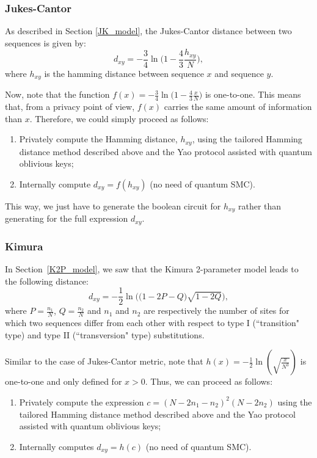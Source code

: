 \subsubsection{Jukes-Cantor} 
As described in Section \ref{JK_model}, the Jukes-Cantor distance between two sequences is given by:
$$d_{xy} = -\frac{3}{4} \ln \Big(1- \frac{4}{3}\frac{h_{xy}}{N}\Big),$$
where $h_{xy}$ is the hamming distance between sequence $x$ and sequence $y$.

Now, note that the function $f(x) = -\frac{3}{4} \ln \Big(1- \frac{4}{3}\frac{x}{N}\Big)$ is one-to-one. This means that, from a privacy point of view, $f(x)$ carries the same amount of information than $x$. Therefore, we could simply proceed as follows:

\begin{enumerate}
    \item Privately compute the Hamming distance, $h_{xy}$, using the tailored Hamming distance method described above and the Yao protocol assisted with quantum oblivious keys;
    \item Internally compute $d_{xy} = f(h_{xy})$ (no need of quantum SMC).
\end{enumerate}

This way, we just have to generate the boolean circuit for $h_{xy}$ rather than generating for the full expression $d_{xy}$.


\subsubsection{Kimura}
In Section~\ref{K2P_model}, we saw that the Kimura 2-parameter model leads to the following distance:
$$d_{xy} = -\frac{1}{2}\ln\bigg( \big(1-2P-Q\big) \sqrt{1-2Q} \bigg),$$
where $P=\frac{n_1}{N}$, $Q=\frac{n_2}{N}$ and $n_1$ and $n_2$ are respectively the number of sites for which two sequences differ from each other with respect to type I (``transition" type) and type II (``transversion" type) substitutions.

Similar to the case of Jukes-Cantor metric, note that $h(x) = -\frac{1}{2}\ln(\sqrt{\frac{x}{N^3}})$ is one-to-one and only defined for $x>0$. Thus, we can proceed as follows:

\begin{enumerate}
    \item Privately compute the expression $c = (N-2n_1-n_2)^2(N-2n_2)$ using the tailored Hamming distance method described above and the Yao protocol assisted with quantum oblivious keys;
    
    \item Internally computes $d_{xy} = h(c)$ (no need of quantum SMC).
\end{enumerate}


